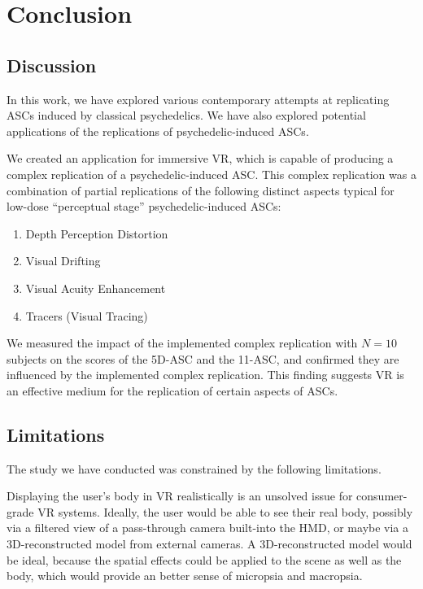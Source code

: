 \chapter{Conclusion}
\section{Discussion}
In this work, we have explored various contemporary attempts at replicating \acfp{ASC} induced by classical psychedelics. We have also explored potential applications of the replications of psychedelic-induced \acp{ASC}.

We created an application for immersive \acf{VR}, which is capable of producing a complex replication of a psychedelic-induced \ac{ASC}. This complex replication was a combination of partial replications of the following distinct aspects typical for low-dose ``perceptual stage'' psychedelic-induced \acp{ASC}:

\begin{enumerate}
    \setlength{\itemsep}{0pt}
    \setlength{\parskip}{0pt}
    \item Depth Perception Distortion
    \item Visual Drifting
    \item Visual Acuity Enhancement
    \item Tracers (Visual Tracing)
\end{enumerate}

We measured the impact of the implemented complex replication with $N=10$ subjects on the scores of the \acf{5D-ASC} and the \acf{11-ASC}, and confirmed they are influenced by the implemented complex replication. This finding suggests \ac{VR} is an effective medium for the replication of certain aspects of \acp{ASC}.

\section{Limitations}
The study we have conducted was constrained by the following limitations.

Displaying the user's body in \ac{VR} realistically is an unsolved issue for consumer-grade \ac{VR} systems. Ideally, the user would be able to see their real body, possibly via a filtered view of a pass-through camera built-into the \acf{HMD}, or maybe via a 3D-reconstructed model from external cameras. A 3D-reconstructed model would be ideal, because the spatial effects could be applied to the scene as well as the body, which would provide an better sense of micropsia and macropsia.

